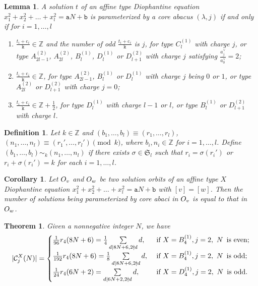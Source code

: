 \documentclass[10pt,a4paper]{amsart}
\newtheorem{lemma}{Lemma}
\newtheorem{definition}{Definition}
\newtheorem{corollary}{Corollary}
\newtheorem{theorem}{Theorem}
\newcommand{\lam}{\lambda}
\begin{document}
\begin{lemma}\label{6.1}
A solution $t$ of an affine type Diophantine equation $x_1^2+x_2^2+\dots+x_l^2=\mathtt{a}N+\mathtt{b}$
is parameterized by a core abacus $(\lam, j)$ if and only if for $i=1, \dots, l$
\begin{enumerate}
\item [{\rm (1)}] $\frac{t_i+\mathrm{c}_i}{\mathtt{k}}\in\mathbb{Z}$
and the number of odd $\frac{t_i+\mathrm{c}_i}{\mathtt{k}}$ is $j$, for type
$C_l^{(1)}$ with charge $j$, 
or type $A_{2l-1}^{(2)}$, $A_{2l}^{(2)}$, $B_l^{(1)}$, $D_l^{(1)}$ or $D_{l+1}^{(2)}$ with charge $j$ satisfying $\frac{a_j^\vee}{a_0^\vee}=2$;
\item [{\rm (2)}] $\frac{t_i+\mathrm{c}_i}{\mathtt{k}}\in\mathbb{Z}$, for type
  $A_{2l-1}^{(2)}$, $B_l^{(1)}$ or $D_l^{(1)}$ with charge $j$ being $0$ or $1$, or type $A_{2l}^{(2)}$ or $D_{l+1}^{(2)}$ with charge $j=0$;
\item [{\rm (3)}] $\frac{t_i+\mathrm{c}_i}{\mathtt{k}}\in\mathbb{Z}+\frac{1}{2}$, for type
$D_l^{(1)}$ with charge $l-1$ or $l$, or type $B_{l}^{(1)}$ or $D_{l+1}^{(2)}$ with charge $l$.
\end{enumerate}
\end{lemma}

\begin{definition}\label{6.3}
Let $k\in \mathbb{Z}$ and $(b_1, \dots, b_l)\equiv (r_1, \dots, r_l)$, $(n_1, \dots, n_l)\equiv (r_1', \dots, r_l') \pmod k$, 
where $b_i, n_i\in \mathbb{Z}$ for $i=1, \dots, l$. Define $(b_1, \dots, b_l) \sim_k (n_1, \dots, n_l)$ if there exists 
$\sigma\in \mathfrak{S}_l$ such that $r_i=\sigma(r_i')$ or $r_i+\sigma(r_i')=k$ for each $i=1, \dots, l$.
\end{definition}

\begin{corollary}\label{6.5}
Let ${\rm O}_v$ and ${\rm O}_w$ be two solution orbits of an affine type $X$ 
Diophantine equation $x_1^2+x_2^2+\dots+x_l^2=\mathtt{a}N+\mathtt{b}$ with $[v]=[w]$.
Then the number of solutions being parameterized by core abaci in ${\rm O}_v$ is equal to that in ${\rm O}_w$.
\end{corollary}

\begin{theorem}
Given a nonnegative integer $N$, we have
$$|\mathcal{C}_j^X(N)|=
\begin{cases}
  \frac{1}{96}r_4(8N+6)=\frac{1}{4}\sum\limits_{d\mid 8N+6, 2\nmid d}d,\, & \mbox{\rm if } X=B_4^{(1)}, j=2, \ N \,\ \text{\rm is even}; \\
  \frac{1}{192}r_4(8N+6)=\frac{1}{8}\sum\limits_{d\mid 8N+6, 2\nmid d}d,\,\, & \mbox{\rm if } X=B_4^{(1)}, j=2, \  N \,\ \text{\rm is odd}; \\
  \frac{1}{24}r_4(6N+2)=\sum\limits_{d\mid 6N+2, 2\nmid d}d, & \mbox{\rm if } X=D_4^{(1)}, j=2,  \  N \,\ \text{\rm is odd}.
\end{cases}
$$
\end{theorem}
\end{document}
